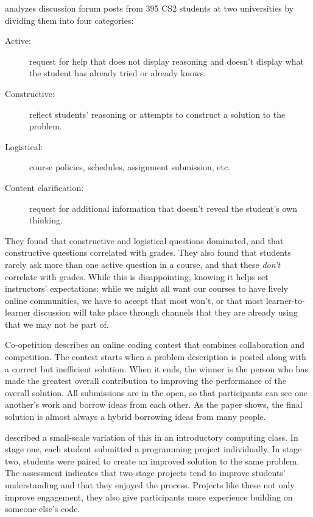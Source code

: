 \cite{Vell2017} analyzes discussion forum posts from 395 CS2 students at two universities
by dividing them into four categories:

\begin{description}

\item[Active:]
  request for help that does not display reasoning
  and doesn't display what the student has already tried or already knows.

\item[Constructive:]
  reflect students' reasoning
  or attempts to construct a solution to the problem.

\item[Logistical:]
  course policies, schedules, assignment submission, etc.

\item[Content clarification:]
  request for additional information
  that doesn't reveal the student's own thinking.

\end{description}

They found that constructive and logistical questions dominated,
and that constructive questions correlated with grades.
They also found that students rarely ask more than one active question in a course,
and that these \emph{don't} correlate with grades.
While this is disappointing,
knowing it helps set instructors' expectations:
while we might all want our courses to have lively online communities,
we have to accept that most won't,
or that most learner-to-learner discussion will take place
through channels that they are already using
that we may not be part of.

\begin{aside}{Co-opetition}
  \cite{Gull2004} describes an online coding contest that combines collaboration and competition.
  The contest starts when a problem description is posted along with a correct but inefficient solution.
  When it ends,
  the winner is the person who has made the greatest overall contribution
  to improving the performance of the overall solution.
  All submissions are in the open,
  so that participants can see one another's work and borrow ideas from each other.
  As the paper shows,
  the final solution is almost always a hybrid borrowing ideas from many people.

  \cite{Batt2018} described a small-scale variation of this in an introductory computing class.
  In stage one,
  each student submitted a programming project individually.
  In stage two,
  students were paired to create an improved solution to the same problem.
  The assessment indicates that two-stage projects tend to improve students' understanding
  and that they enjoyed the process.
  Projects like these not only improve engagement,
  they also give participants more experience building on someone else's code.
\end{aside}

